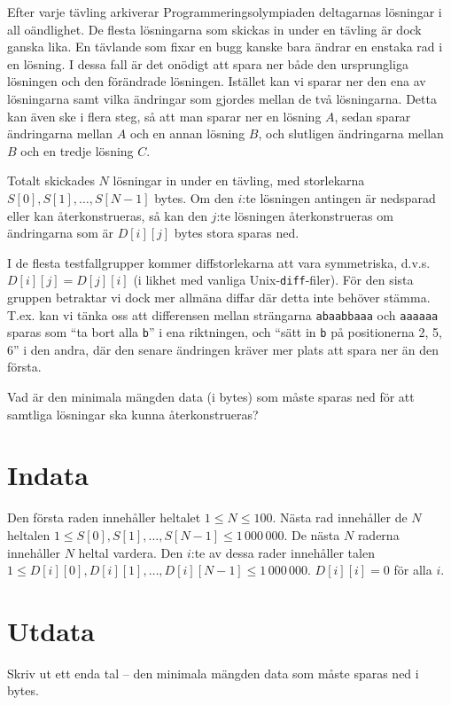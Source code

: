 \def\version{1}
Efter varje tävling arkiverar Programmeringsolympiaden deltagarnas lösningar i all oändlighet.
De flesta lösningarna som skickas in under en tävling är dock ganska lika.
En tävlande som fixar en bugg kanske bara ändrar en enstaka rad i en lösning.
I dessa fall är det onödigt att spara ner både den ursprungliga lösningen och den förändrade lösningen.
Istället kan vi sparar ner den ena av lösningarna samt vilka ändringar som gjordes mellan de två lösningarna.
Detta kan även ske i flera steg, så att man sparar ner en lösning $A$, sedan sparar ändringarna mellan $A$ och en annan lösning $B$, och slutligen ändringarna mellan $B$ och en tredje lösning $C$.

Totalt skickades $N$ lösningar in under en tävling, med storlekarna $S[0], S[1], \dots, S[N-1]$ bytes.
Om den $i$:te lösningen antingen är nedsparad eller kan återkonstrueras, så kan den $j$:te lösningen återkonstrueras om ändringarna som är $D[i][j]$ bytes stora sparas ned.

I de flesta testfallgrupper kommer diffstorlekarna att vara symmetriska, d.v.s. $D[i][j] = D[j][i]$ (i likhet med vanliga Unix-\texttt{diff}-filer).
För den sista gruppen betraktar vi dock mer allmäna diffar där detta inte behöver stämma.
T.ex. kan vi tänka oss att differensen mellan strängarna \texttt{abaabbaaa} och \texttt{aaaaaa} sparas som ``ta bort alla \texttt{b}'' i ena riktningen, och ``sätt in \texttt{b} på positionerna 2, 5, 6'' i den andra, där den senare ändringen kräver mer plats att spara ner än den första.

Vad är den minimala mängden data (i bytes) som måste sparas ned för att samtliga lösningar ska kunna återkonstrueras?

\section*{Indata}
Den första raden innehåller heltalet $1 \le N \le 100$.
Nästa rad innehåller de $N$ heltalen $1 \le S[0], S[1], \dots, S[N-1] \le 1\,000\,000$.
De nästa $N$ raderna innehåller $N$ heltal vardera.
Den $i$:te av dessa rader innehåller talen $1 \le D[i][0], D[i][1], \dots, D[i][N-1] \le 1\,000\,000$.
$D[i][i] = 0$ för alla $i$.

\section*{Utdata}
Skriv ut ett enda tal -- den minimala mängden data som måste sparas ned i bytes.

